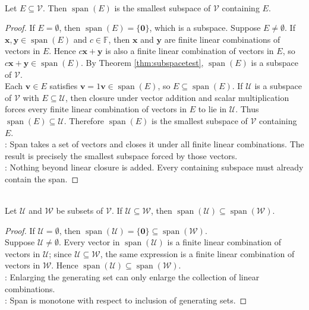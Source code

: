 \begin{theorem} \label{thm:span-smallest-containing-subspace} \\
Let $E\subseteq\mathcal{V}$. Then $\operatorname{span}(E)$ is the smallest subspace of $\mathcal{V}$ containing $E$.
\begin{proof}
If $E=\emptyset$, then $\operatorname{span}(E)=\{\mathbf{0}\}$, which is a subspace. Suppose $E\neq\emptyset$. If $\mathbf{x},\mathbf{y}\in\operatorname{span}(E)$ and $c\in\mathbb{F}$, then $\mathbf{x}$ and $\mathbf{y}$ are finite linear combinations of vectors in $E$. Hence $c\mathbf{x}+\mathbf{y}$ is also a finite linear combination of vectors in $E$, so $c\mathbf{x}+\mathbf{y}\in\operatorname{span}(E)$. By Theorem \ref{thm:subspacetest}, $\operatorname{span}(E)$ is a subspace of $\mathcal{V}$.\\
Each $\mathbf{v}\in E$ satisfies $\mathbf{v}=1\mathbf{v}\in\operatorname{span}(E)$, so $E\subseteq\operatorname{span}(E)$. If $\mathcal{U}$ is a subspace of $\mathcal{V}$ with $E\subseteq\mathcal{U}$, then closure under vector addition and scalar multiplication forces every finite linear combination of vectors in $E$ to lie in $\mathcal{U}$. Thus $\operatorname{span}(E)\subseteq\mathcal{U}$. Therefore $\operatorname{span}(E)$ is the smallest subspace of $\mathcal{V}$ containing $E$.\\
: Span takes a set of vectors and closes it under all finite linear combinations. The result is precisely the smallest subspace forced by those vectors.\\
: Nothing beyond linear closure is added. Every containing subspace must already contain the span.
\end{proof}
\end{theorem}

\begin{proposition} \label{prop:spanmonotonicity} \\
Let $\mathcal{U}$ and $\mathcal{W}$ be subsets of $\mathcal{V}$. If $\mathcal{U}\subseteq\mathcal{W}$, then $\operatorname{span}(\mathcal{U})\subseteq\operatorname{span}(\mathcal{W})$.
\begin{proof}
If $\mathcal{U}=\emptyset$, then $\operatorname{span}(\mathcal{U})=\{\mathbf{0}\}\subseteq\operatorname{span}(\mathcal{W})$.\\
Suppose $\mathcal{U}\neq\emptyset$. Every vector in $\operatorname{span}(\mathcal{U})$ is a finite linear combination of vectors in $\mathcal{U}$; since $\mathcal{U}\subseteq\mathcal{W}$, the same expression is a finite linear combination of vectors in $\mathcal{W}$. Hence $\operatorname{span}(\mathcal{U})\subseteq\operatorname{span}(\mathcal{W})$.\\
: Enlarging the generating set can only enlarge the collection of linear combinations.\\
: Span is monotone with respect to inclusion of generating sets.
\end{proof}
\end{proposition}

